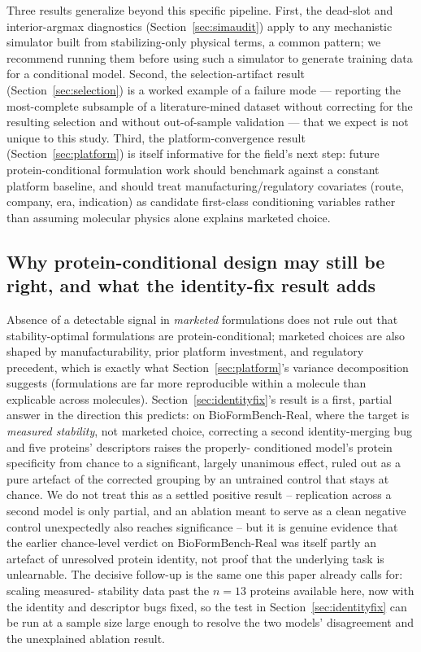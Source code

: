 \documentclass[twocolumn,10pt]{article}
\begin{document}
Three results generalize beyond this specific pipeline. First, the dead-slot and
interior-argmax diagnostics (Section~\ref{sec:simaudit}) apply to any mechanistic
simulator built from stabilizing-only physical terms, a common pattern; we
recommend running them before using such a simulator to generate training data
for a conditional model. Second, the selection-artifact result
(Section~\ref{sec:selection}) is a worked example of a failure mode --- reporting
the most-complete subsample of a literature-mined dataset without correcting for
the resulting selection and without out-of-sample validation --- that we expect
is not unique to this study. Third, the platform-convergence result
(Section~\ref{sec:platform}) is itself informative for the field's next step:
future protein-conditional formulation work should benchmark against a constant
platform baseline, and should treat manufacturing/regulatory covariates (route,
company, era, indication) as candidate first-class conditioning variables rather
than assuming molecular physics alone explains marketed choice.

\subsection{Why protein-conditional design may still be right, and what the
identity-fix result adds}

Absence of a detectable signal in \emph{marketed} formulations does not rule out
that stability-optimal formulations are protein-conditional; marketed choices are
also shaped by manufacturability, prior platform investment, and regulatory
precedent, which is exactly what Section~\ref{sec:platform}'s variance
decomposition suggests (formulations are far more reproducible within a molecule
than explicable across molecules). Section~\ref{sec:identityfix}'s result is a
first, partial answer in the direction this predicts: on BioFormBench-Real,
where the target is \emph{measured stability}, not marketed choice, correcting a
second identity-merging bug and five proteins' descriptors raises the properly-
conditioned model's protein specificity from chance to a significant, largely
unanimous effect, ruled out as a pure artefact of the corrected grouping by an
untrained control that stays at chance. We do not treat this as a settled
positive result -- replication across a second model is only partial, and an
ablation meant to serve as a clean negative control unexpectedly also reaches
significance -- but it is genuine evidence that the earlier chance-level verdict
on BioFormBench-Real was itself partly an artefact of unresolved protein
identity, not proof that the underlying task is unlearnable. The decisive
follow-up is the same one this paper already calls for: scaling measured-
stability data past the $n=13$ proteins available here, now with the identity
and descriptor bugs fixed, so the test in Section~\ref{sec:identityfix} can be
run at a sample size large enough to resolve the two models' disagreement and
the unexplained ablation result.
\end{document}
